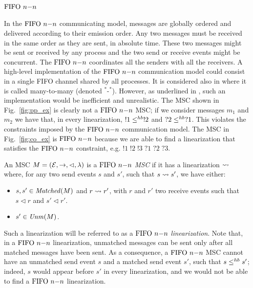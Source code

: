 \paragraph{\bf $\nn$}
In the $\nn$ communicating model, messages are globally ordered and delivered according to  their emission order. Any two messages must be received in the same order as they are sent, in absolute time. These two messages might be sent or received by any process and the two send or receive events might be concurrent.
The $\nn$ coordinates all the senders with all the receivers. A high-level implementation of the $\nn$ communication model could consist in a single FIFO channel shared by all processes. It is considered also in \cite{DBLP:journals/tcs/BasuB16} where it is called  many-to-many (denoted $^\ast$-$^\ast$). However, as underlined in \cite{DBLP:journals/fac/ChevrouHQ16}, such an implementation would be inefficient and unrealistic.
The MSC shown in Fig.~\ref{fig:pp_ex} is clearly not a $\nn$ MSC; if we consider messages $m_1$ and $m_2$ we have that, in every linearization, $!1 \leq^{hb} !2$ and $?2 \leq^{hb} ?1$. This violates the constraints imposed by the $\nn$ communication model. The MSC in Fig.~\ref{fig:co_ex} is $\nn$ because we are able to find a linearization that satisfies the $\nn$ constraint, e.g. $!1\;!2\;!3\;?1\;?2\;?3$.

\begin{definition}[$\nn$ MSC]\label{def:n_n}
	An MSC $M = (\mathcal{E},\to,\lhd,\lambda)$ is a \emph{$\nn$ MSC} if it has a linearization $\rightsquigarrow$ where, for any two send events $s$ and $s'$, such that $s \rightsquigarrow s'$, we have either:
	\begin{itemize}%
		\item $s,s' \in \mathit{Matched}(M)$ and $r \rightsquigarrow r'$, with $r$ and $r'$  two receive events such that $s \lhd r$ and $s' \lhd r'$.
		\item $s' \in \mathit{Unm}(M)$.
	\end{itemize}
\end{definition}

Such a linearization will be referred to as a \emph{$\nn$ linearization}. Note that, in a $\nn$ linearization, unmatched messages can be sent only after all matched messages have been sent.
As a consequence, a $\nn$ MSC cannot have an unmatched send event $s$ and a matched send event $s'$, such that $s \leq^{hb} s'$; indeed, $s$ would appear before $s'$ in every linearization, and we would not be able to find a $\nn$ linearization. 


